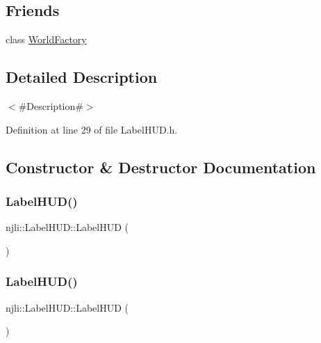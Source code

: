 \subsection*{Friends}
\begin{DoxyCompactItemize}
\item 
class \mbox{\hyperlink{classnjli_1_1_label_h_u_d_acb96ebb09abe8f2a37a915a842babfac}{World\+Factory}}
\end{DoxyCompactItemize}


\subsection{Detailed Description}
$<$\#\+Description\#$>$ 

Definition at line 29 of file Label\+H\+U\+D.\+h.



\subsection{Constructor \& Destructor Documentation}
\mbox{\label{classnjli_1_1_label_h_u_d_a8b2fa2f2b349bf0f426a29b88816c61b}} 
\subsubsection{\texorpdfstring{Label\+H\+U\+D()}{LabelHUD()}\hspace{0.1cm}{\footnotesize\ttfamily [1/3]}}
{\footnotesize\ttfamily njli\+::\+Label\+H\+U\+D\+::\+Label\+H\+UD (\begin{DoxyParamCaption}{ }\end{DoxyParamCaption})\hspace{0.3cm}{\ttfamily [protected]}}

\mbox{\label{classnjli_1_1_label_h_u_d_aec37b679f1007bef302e96521d4bf793}} 
\subsubsection{\texorpdfstring{Label\+H\+U\+D()}{LabelHUD()}\hspace{0.1cm}{\footnotesize\ttfamily [2/3]}}
{\footnotesize\ttfamily njli\+::\+Label\+H\+U\+D\+::\+Label\+H\+UD (\begin{DoxyParamCaption}\item[{const \mbox{\hyperlink{classnjli_1_1_abstract_builder}{Abstract\+Builder}} \&}]{ }\end{DoxyParamCaption})\hspace{0.3cm}{\ttfamily [protected]}}


